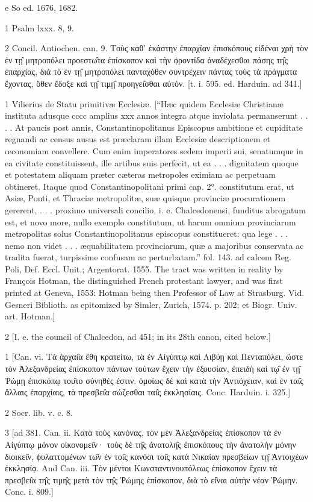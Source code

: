 e
So ed. 1676, 1682.

1
Psalm lxxx. 8, 9.

2
Concil. Antiochen. can. 9. Τοὺς καθ’ ἑκάστην ἐπαρχίαν ἐπισκόπους εἰδέναι χρὴ τὸν ἐν τῃ̑ μητροπόλει προεστω̑τα ἐπίσκοπον καὶ τὴν ϕροντίδα ἀναδέχεσθαι πάσης τη̑ς ἐπαρχίας, διὰ τὸ ἐν τῃ̑ μητροπόλει πανταχόθεν συντρέχειν πάντας τοὺς τὰ πράγματα ἔχοντας, ὅθεν ἔδοξε καὶ τῃ̑ τιμῃ̑ προηγει̑σθαι αὐτόν. [t. i. 595. ed. Harduin. ad 341.]

1
Vilierius de Statu primitivæ Ecclesiæ. [“Hæc quidem Ecclesiæ Christianæ instituta adusque cccc amplius xxx annos integra atque inviolata permanserunt . . . . At paucis post annis, Constantinopolitanus Episcopus ambitione et cupiditate regnandi ac census ausus est præclaram illam Ecclesiæ descriptionem et œconomiam convellere. Cum enim imperatores sedem imperii sui, senatumque in ea civitate constituissent, ille artibus suis perfecit, ut ea . . . dignitatem quoque et potestatem aliquam præter cæteras metropoles eximiam ac perpetuam obtineret. Itaque quod Constantinopolitani primi cap. 2°. constitutum erat, ut Asiæ, Ponti, et Thraciæ metropolitæ, suæ quisque provinciæ procurationem gererent, . . . proximo universali concilio, i. e. Chalcedonensi, funditus abrogatum est, et novo more, nullo exemplo constitutum, ut harum omnium provinciarum metropolitas solus Constantinopolitanus episcopus constitueret: qua lege . . . nemo non videt . . . æquabilitatem provinciarum, quæ a majoribus conservata ac tradita fuerat, turpissime confusam ac perturbatam.” fol. 143. ad calcem Reg. Poli, Def. Eccl. Unit.; Argentorat. 1555. The tract was written in reality by François Hotman, the distinguished French protestant lawyer, and was first printed at Geneva, 1553: Hotman being then Professor of Law at Strasburg. Vid. Gesneri Biblioth. as epitomized by Simler, Zurich, 1574. p. 202; et Biogr. Univ. art. Hotman.]

2
[I. e. the council of Chalcedon, ad 451; in its 28th canon, cited below.]

1
[Can. vi. Τὰ ἀρχαι̑α ἔθη κρατείτω, τὰ ἐν Αἰγύπτῳ καὶ Λιβύῃ καὶ Πενταπόλει, ὥστε τὸν Ἀλεξανδρείας ἐπίσκοπον πάντων τούτων ἔχειν τὴν ἐξουσίαν, ἐπειδὴ καὶ τῳ̑ ἐν τῃ̑ Ῥώμῃ ἐπισκόπῳ του̑το σύνηθές ἐστιν. ὁμοίως δὲ καὶ κατὰ τὴν Ἀντιόχειαν, καὶ ἐν ται̑ς ἄλλαις ἐπαρχίαις, τὰ πρεσβει̑α σώζεσθαι ται̑ς ἐκκλησίαις. Conc. Harduin. i. 325.]

2
Socr. lib. v. c. 8.

3
[ad 381. Can. ii. Κατὰ τοὺς κανόνας, τὸν μὲν Ἀλεξανδρείας ἐπίσκοπον τὰ ἐν Αἰγύπτῳ μόνον οἰκονομει̑ν· τοὺς δὲ τη̑ς ἀνατολη̑ς ἐπισκόπους τὴν ἀνατολὴν μόνην διοικει̑ν, ϕυλαττομένων τω̑ν ἐν τοι̑ς κανόσι τοι̑ς κατὰ Νικαίαν πρεσβείων τῃ̑ Ἀντοιχέων ἐκκλησίᾳ. And Can. iii. Τὸν μέντοι Κωνσταντινουπόλεως ἐπίσκοπον ἔχειν τὰ πρεσβει̑α τη̑ς τιμη̑ς μετὰ τὸν τη̑ς Ῥώμης ἐπίσκοπον, διὰ τὸ εἰ̑ναι αὐτὴν νέαν Ῥώμην. Conc. i. 809.]

